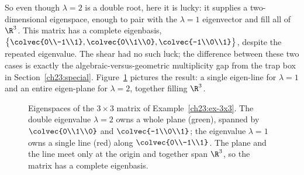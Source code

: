 \begin{example}
So even though $\lambda=2$ is a double root, here it is lucky: it supplies a
two-dimensional eigenspace, enough to pair with the $\lambda=1$ eigenvector and
fill all of $\R^3$. This matrix has a complete eigenbasis,
$\bigl\{\colvec{0\\-1\\1},\colvec{0\\1\\0},\colvec{-1\\0\\1}\bigr\}$, despite the
repeated eigenvalue. The shear had no such luck; the difference between these two
cases is exactly the algebraic-versus-geometric multiplicity gap from the trap box
in Section~\ref{ch23:special}. Figure~\ref{ch23:fig-3x3} pictures the result: a
single eigen-line for $\lambda=1$ and an entire eigen-plane for $\lambda=2$,
together filling $\R^3$.
\end{example}

\begin{figure}[H]
\centering
{}
\caption{Eigenspaces of the $3\times 3$ matrix of Example~\ref{ch23:ex-3x3}. The
double eigenvalue $\lambda=2$ owns a whole plane (green), spanned by
$\colvec{0\\1\\0}$ and $\colvec{-1\\0\\1}$; the eigenvalue $\lambda=1$ owns a single
line (red) along $\colvec{0\\-1\\1}$. The plane and the line meet only at the origin
and together span $\R^3$, so the matrix has a complete eigenbasis.}
\label{ch23:fig-3x3}
\end{figure}


